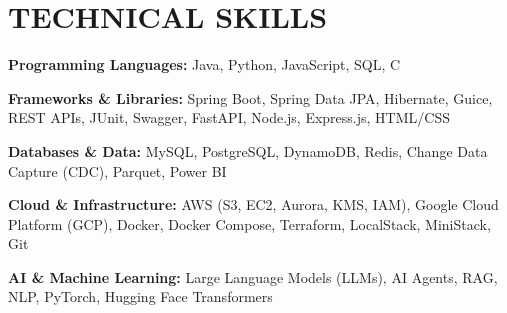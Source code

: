 \vspace{3pt}
\section{TECHNICAL SKILLS}

{\small
\setlength{\parskip}{0pt}
\setlength{\baselineskip}{9.8pt}

\textbf{Programming Languages:} Java, Python, JavaScript, SQL, C\par
\textbf{Frameworks \& Libraries:} Spring Boot, Spring Data JPA, Hibernate, Guice, REST APIs, JUnit, Swagger, FastAPI, Node.js, Express.js, HTML/CSS\par
\textbf{Databases \& Data:} MySQL, PostgreSQL, DynamoDB, Redis, Change Data Capture (CDC), Parquet, Power BI\par
\textbf{Cloud \& Infrastructure:} AWS (S3, EC2, Aurora, KMS, IAM), Google Cloud Platform (GCP), Docker, Docker Compose, Terraform, LocalStack, MiniStack, Git\par
\textbf{AI \& Machine Learning:} Large Language Models (LLMs), AI Agents, RAG, NLP, PyTorch, Hugging Face Transformers
}

\vspace{-2pt}